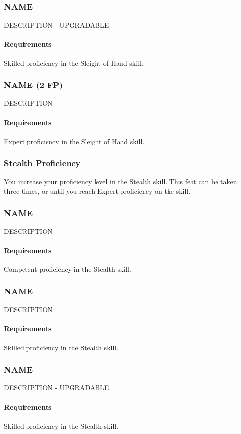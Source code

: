 \subsubsection{NAME} \label{feat::name}
    DESCRIPTION - UPGRADABLE
    \paragraph{Requirements} Skilled proficiency in the Sleight of Hand skill.
\subsubsection{NAME (2 FP)} \label{feat::name}
    DESCRIPTION
    \paragraph{Requirements} Expert proficiency in the Sleight of Hand skill.
\subsubsection{Stealth Proficiency} \label{feat::stealthprof}
    You increase your proficiency level in the Stealth skill.
    This feat can be taken three times, or until you reach Expert proficiency on the skill.
\subsubsection{NAME} \label{feat::name}
    DESCRIPTION
    \paragraph{Requirements} Competent proficiency in the Stealth skill.
\subsubsection{NAME} \label{feat::name}
    DESCRIPTION
    \paragraph{Requirements} Skilled proficiency in the Stealth skill.
\subsubsection{NAME} \label{feat::name}
    DESCRIPTION - UPGRADABLE
    \paragraph{Requirements} Skilled proficiency in the Stealth skill.
